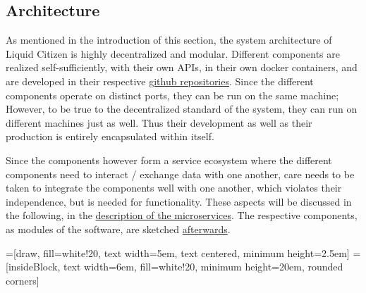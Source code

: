\subsection{Architecture}
\label{ssec:Architecture}
As mentioned in the introduction of this section, the system architecture of Liquid Citizen is highly decentralized and modular. Different components are realized self-sufficiently, with their own APIs, in their own docker containers, and are developed in their respective \href{https://github.com/Liquid-Citizen}{github repositories}. Since the different components operate on distinct ports, they can be run on the same machine; However, to be true to the decentralized standard of the system, they can run on different machines just as well. Thus their development as well as their production is entirely encapsulated within itself.

Since the components however form a service ecosystem where the different components need to interact / exchange data with one another, care needs to be taken to integrate the components well with one another, which violates their independence, but is needed for functionality. These aspects will be discussed in the following, in the \hyperref[ssec:Microservices]{description of the microservices}. The respective components, as modules of the software, are sketched \hyperref[ssec:Modules]{afterwards}.


=[draw, fill=white!20, text width=5em, 
    text centered, minimum height=2.5em]
 = [insideBlock, text width=6em, fill=white!20, 
    minimum height=20em, rounded corners]
\def\blockdist{2.3}
\def\edgedist{2.5}

